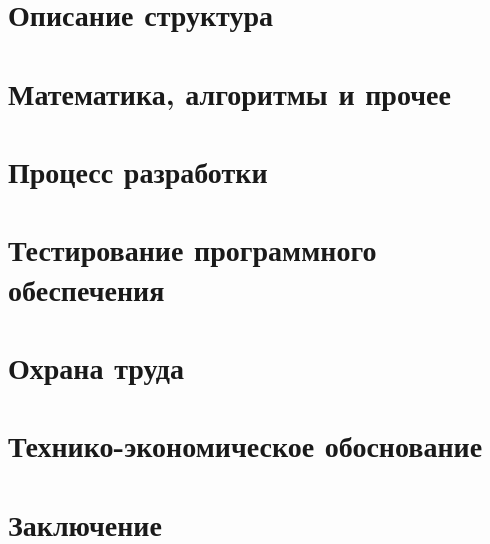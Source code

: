 




\newpage
{}
\renewcommand\contentsname{\hfill Содержание \hfill}
\tableofcontents

\section{Описание структура}


\section{Математика, алгоритмы и прочее}


\section{Процесс разработки}


\section{Тестирование программного обеспечения}


\section{Охрана труда}


\section{Технико-экономическое обоснование}


\section{Заключение}

\newpage
\renewcommand{\refname}{Список использованных источников}


